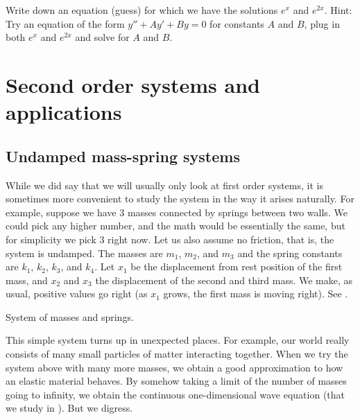 \begin{exercise}
Write down an equation (guess) for which we have the solutions
$e^x$ and $e^{2x}$.  Hint: Try an equation of the form
$y''+Ay'+By = 0$ for constants $A$ and $B$,
plug in both $e^x$ and $e^{2x}$ and solve for $A$ and $B$.
\end{exercise}


\sectionnewpage
\section{Second order systems and applications}
\label{sol:section}



\subsection{Undamped mass-spring systems}

While we did say that we will usually only look at first order systems, it is
sometimes more convenient to study the system in the way it arises naturally.
For example, suppose we have 3 masses connected by springs between two
walls.  We could pick any higher number, and the math would be essentially
the same, but for simplicity we pick 3 right now.  Let us also assume no
friction, that is, the system is undamped.
The masses are $m_1$, $m_2$, and
$m_3$ and the spring constants are $k_1$, $k_2$, $k_3$, and $k_4$.
Let $x_1$ be the displacement from rest position of the first mass, and
$x_2$ and $x_3$ the displacement of the second and third mass.  We make,
as usual, positive values go right (as $x_1$ grows, the first mass is
moving right).
See .

\begin{myfig}
\capstart
{}
\caption{System of masses and springs.\label{sosa:threecartsfig}}
\end{myfig}

This simple system turns up in unexpected places.  For example, 
our world really consists of many small particles of matter interacting together.
When we try the system above with many more masses, we obtain a good approximation to
how an elastic material behaves.  By somehow taking a limit of
the number of masses going to infinity, we obtain the continuous
one-dimensional wave equation (that we study in ).
But we digress.


